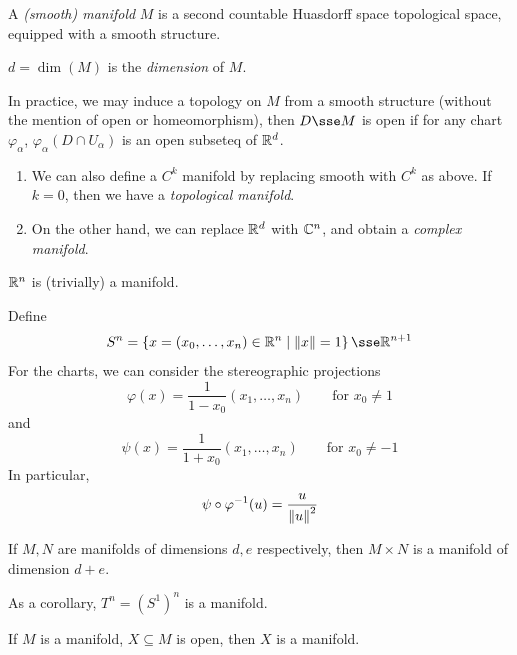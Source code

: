 \documentclass{article}
\begin{document}
\begin{definition}
    [manifold] A \emph{(smooth) manifold} \(M\) is a second countable Huasdorff space topological space, equipped with a smooth structure.

    \(d = \dim(M)\) is the \emph{dimension} of \(M\).
\end{definition}

In practice, we may induce a topology on \(M\) from a smooth structure (without the mention of open or homeomorphism), then \(D \sse M\) is open if for any chart \(\varphi_\alpha\), \(\varphi_\alpha(D \cap U_\alpha)\) is an open subseteq of \(\mathbb{R}^d\).

\begin{remark}
    \begin{enumerate}
        \item We can also define a \(C^k\) manifold by replacing smooth with \(C^k\) as above. If \(k = 0\), then we have a \emph{topological manifold}.
        \item On the other hand, we can replace \(\mathbb{R}^d\) with \(\mathbb{C}^n\), and obtain a \emph{complex manifold}.
    \end{enumerate}
\end{remark}

\(\mathbb{R}^n\) is (trivially) a manifold.

\begin{example}
    Define
    \[S^n = \left\{x = (x_0, \dots, x_n) \in \R^n \mid \norm{x} = 1\right\} \sse \R^{n+1}\]
    For the charts, we can consider the stereographic projections
    \[\varphi(x) = \frac{1}{1-x_0}(x_1, \dots, x_n) \qquad \text{for }x_0 \ne 1\]
    and
    \[\psi(x) = \frac{1}{1+x_0}(x_1, \dots, x_n) \qquad \text{for }x_0 \ne -1\]
    In particular,
    \[\psi \circ \varphi^{-1}(u) = \frac{u}{\norm{u}^2}\]
\end{example}

\begin{example}
    If \(M, N\) are manifolds of dimensions \(d,e\) respectively, then \(M \times N\) is a manifold of dimension \(d + e\).
\end{example}

As a corollary, \(T^n = (S^1)^n\) is a manifold.

\begin{example}
    If \(M\) is a manifold, \(X \subseteq M\) is open, then \(X\) is a manifold.
\end{example}
\end{document}
